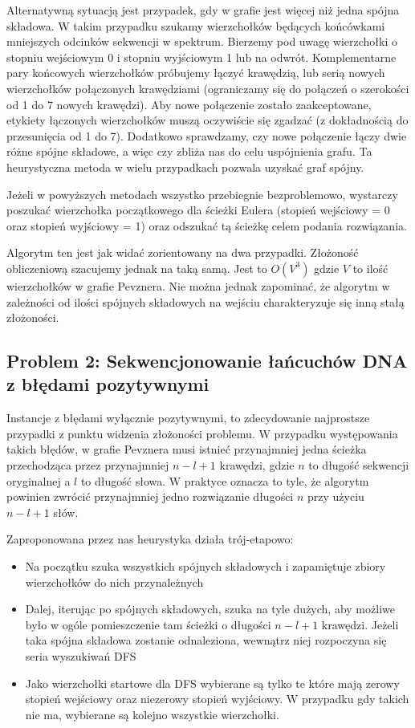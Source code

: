 \documentclass[a4paper]{article}
\begin{document}
Alternatywną sytuacją jest przypadek, gdy w grafie jest więcej niż jedna spójna składowa. W takim przypadku
szukamy wierzchołków będących końcówkami mniejszych odcinków sekwencji w spektrum. Bierzemy pod uwagę wierzchołki o
stopniu wejściowym 0 i stopniu  wyjściowym 1 lub na odwrót. Komplementarne pary końcowych wierzchołków próbujemy
łączyć krawędzią, lub serią nowych wierzchołków połączonych krawędziami (ograniczamy się do połączeń o szerokości od 1
do 7 nowych krawędzi). Aby nowe połączenie zostało zaakceptowane, etykiety łączonych wierzchołków muszą oczywiście się
zgadzać (z dokładnością do przesunięcia od 1 do 7). Dodatkowo sprawdzamy, czy nowe połączenie łączy dwie różne
spójne składowe, a więc czy zbliża nas do celu uspójnienia grafu.
Ta heurystyczna metoda w wielu przypadkach pozwala uzyskać graf spójny.


Jeżeli w powyższych metodach wszystko przebiegnie bezproblemowo, wystarczy poszukać wierzchołka początkowego dla ścieżki
Eulera (stopień wejściowy = 0 oraz stopień wyjściowy = 1) oraz odszukać tą ścieżkę celem podania rozwiązania.

Algorytm ten jest jak widać zorientowany na dwa przypadki. Złożoność obliczeniową szacujemy jednak na taką samą.
Jest to $O(V^3)$ gdzie $V$ to ilość wierzchołków w grafie Pevznera. Nie można jednak zapominać, że algorytm w zależności
od ilości spójnych składowych na wejściu charakteryzuje się inną stałą złożoności.

\subsection{Problem 2: Sekwencjonowanie łańcuchów DNA z błędami pozytywnymi}
Instancje z błędami wyłącznie pozytywnymi, to zdecydowanie najprostsze przypadki z punktu widzenia złożoności problemu.
W przypadku występowania takich błędów, w grafie Pevznera musi istnieć przynajmniej jedna ścieżka przechodząca przez
przynajmniej $n-l+1$ krawędzi, gdzie $n$ to długość sekwencji oryginalnej a $l$ to długość słowa. W praktyce oznacza to tyle,
że algorytm powinien zwrócić przynajmniej jedno rozwiązanie długości $n$ przy użyciu $n-l+1$ słów.

Zaproponowana przez nas heurystyka działa trój-etapowo:
\begin{itemize}
\item Na początku szuka wszystkich spójnych składowych i zapamiętuje zbiory wierzchołków do nich przynależnych
\item Dalej, iterując po spójnych składowych, szuka na tyle dużych, aby możliwe było w ogóle pomieszczenie tam ścieżki
o długości $n-l+1$ krawędzi. Jeżeli taka spójna składowa zostanie odnaleziona, wewnątrz niej rozpoczyna się seria
wyszukiwań DFS
\item Jako wierzchołki startowe dla DFS wybierane są tylko te które mają zerowy stopień wejściowy oraz niezerowy
stopień wyjściowy. W przypadku gdy takich nie ma, wybierane są kolejno wszystkie wierzchołki.
\end{itemize}
\end{document}
